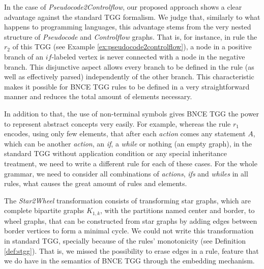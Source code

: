In the case of \emph{Pseudocode2Controlflow}, our proposed approach shows a clear advantage against the standard TGG formalism. We judge that, similarly to what happens to programming languages, this advantage stems from the very nested structure of \emph{Pseudocode} and \emph{Controlflow} graphs. That is, for instance, in rule the $r_2$ of this TGG (see Example \ref{ex:pseudocode2controlflow}), a node in a positive branch of an $if$-labeled vertex is never connected with a node in the negative branch. This disjunctive aspect allows every branch to be defined in the rule (as well as effectively parsed) independently of the other branch. This characteristic makes it possible for BNCE TGG rules to be defined in a very straightforward manner and reduces the total amount of elements necessary.

In addition to that, the use of non-terminal symbols gives BNCE TGG the power to represent abstract concepts very easily. For example, whereas the rule $r_1$ encodes, using only few elements, that after each \emph{action} comes any statement $A$, which can be another \emph{action}, an \emph{if}, a \emph{while} or nothing (an empty graph), in the standard TGG without application condition or any special inheritance treatment, we need to write a different rule for each of these cases. For the whole grammar, we need to consider all combinations of \emph{actions}, \emph{ifs} and \emph{whiles} in all rules, what causes the great amount of rules and elements.

The \emph{Star2Wheel} transformation consists of transforming star graphs, which are complete bipartite graphs $K_{1,k}$, with the partitions named center and border, to wheel graphs, that can be constructed from star graphs by adding edges between border vertices to form a minimal cycle. We could not write this transformation in standard TGG, specially because of the rules' monotonicity (see Definition \ref{def:stgg}). That is, we missed the possibility to erase edges in a rule, feature that we do have in the semantics of BNCE TGG through the embedding mechanism.




